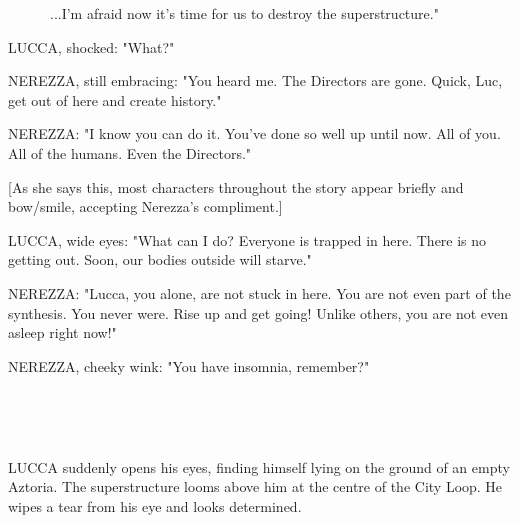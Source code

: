 \documentclass[11pt]{article}
\begin{document}
\ \ \ \ \ \ ...I'm afraid now it's time for us to destroy the superstructure."

LUCCA, shocked: "What?"

NEREZZA, still embracing: "You heard me.
The Directors are gone.
Quick, Luc, get out of here and create history."

NEREZZA: "I know you can do it.
You've done so well up until now.
All of you.
All of the humans.
Even the Directors."

[As she says this, most characters throughout the story appear briefly and bow/smile, accepting Nerezza's compliment.]

LUCCA, wide eyes: "What can I do? 
Everyone is trapped in here. 
There is no getting out.
Soon, our bodies outside will starve."

NEREZZA: "Lucca, you alone, are not stuck in here. 
You are not even part of the synthesis.
You never were. 
Rise up and get going!
Unlike others, you are not even asleep right now!"

NEREZZA, cheeky wink: "You have insomnia, remember?"

\ 

\ 

LUCCA suddenly opens his eyes, finding himself lying on the ground of an empty Aztoria.
The superstructure looms above him at the centre of the City Loop.
He wipes a tear from his eye and looks determined.
\end{document}
